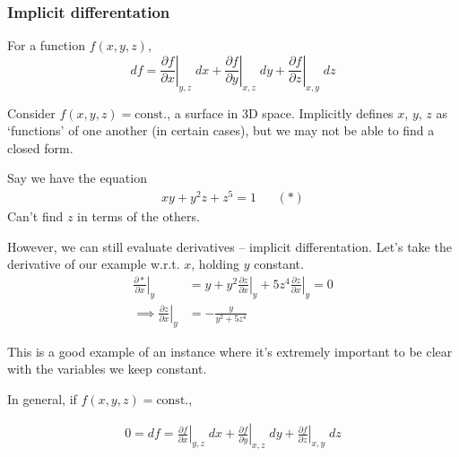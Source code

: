 \documentclass{../../template/note}
\begin{document}
    \subsubsection{Implicit differentation}

    \begin{proposition}
        For a function \(f(x, y, z)\),
        \[
            df = \left.\frac{\partial f}{\partial x}\right|_{y, z}\; dx + \left.\frac{\partial f}{\partial y}\right|_{x, z}\; dy + \left.\frac{\partial f}{\partial z}\right|_{x, y}\; dz
        \]
    \end{proposition}
    
    Consider \(f(x, y, z) = \text{const.}\), a surface in 3D space. Implicitly defines \(x\), \(y\), \(z\) as `functions' of one another (in certain cases), but we may not be able to find a closed form.

    \begin{example}
        Say we have the equation
        \begin{align*}
            xy + y^2z + z^5 = 1 && (*)
        \end{align*}
        Can't find \(z\) in terms of the others.
    \end{example}
    
    However, we can still evaluate derivatives -- implicit differentation. Let's take the derivative of our example w.r.t. \(x\), holding \(y\) constant.
    \begin{align*}
        \left.\frac{\partial *}{\partial x}\right|_y &= y + y^2 \left.\frac{\partial z}{\partial x}\right|_y  + 5z^4 \left.\frac{\partial z}{\partial x}\right|_y  = 0 \\
        \implies \left.\frac{\partial z}{\partial x}\right|_y &= -\frac{y}{y^2+5z^4}
    \end{align*}
    
    

    This is a good example of an instance where it's extremely important to be clear with the variables we keep constant.

    In general, if \(f(x, y, z) = \text{const.}\),

    \begin{align*}
        0 = df = \left.\frac{\partial f}{\partial x}\right|_{y, z}\; dx + \left.\frac{\partial f}{\partial y}\right|_{x, z}\; dy + \left.\frac{\partial f}{\partial z}\right|_{x, y}\; dz
    \end{align*}
    
\end{document}
